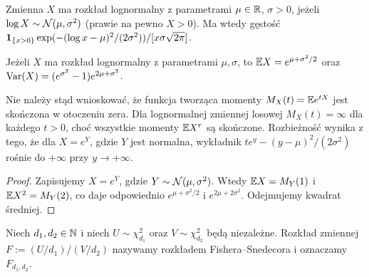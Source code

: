 \begin{definicja}
Zmienna $X$ ma rozkład lognormalny z parametrami
$\mu\in\mathbb{R}$, $\sigma>0$, jeżeli $\log X\sim\mathcal{N}(\mu,\sigma^2)$
(prawie na pewno $X>0$). Ma wtedy gęstość
$\mathbf{1}_{\{x>0\}}\exp(- (\log x-\mu)^2/(2\sigma^2))
/[x\sigma\sqrt{2\pi}]$.
\end{definicja}

\begin{stwierdzenie}
Jeżeli $X$ ma rozkład lognormalny z parametrami $\mu,\sigma$,
to $\mathbb{E} X=e^{\mu+\sigma^2/2}$ oraz
$\operatorname{Var}(X)=(e^{\sigma^2}-1)e^{2\mu+\sigma^2}$.
\end{stwierdzenie}
\begin{uwaga}
Nie należy stąd wnioskować, że funkcja tworząca momenty
$M_X(t)=\mathbb{E} e^{tX}$ jest skończona w otoczeniu zera.
Dla lognormalnej zmiennej losowej $M_X(t)=\infty$
dla każdego $t>0$, choć wszystkie momenty
$\mathbb{E} X^r$ są skończone. Rozbieżność wynika z tego,
że dla $X=e^Y$, gdzie $Y$ jest normalna,
wykładnik $te^y-(y-\mu)^2/(2\sigma^2)$
rośnie do $+\infty$ przy $y\to+\infty$.
\end{uwaga}
\begin{proof}
Zapisujemy $X=e^Y$, gdzie $Y\sim\mathcal{N}(\mu,\sigma^2)$.
Wtedy $\mathbb{E} X=M_Y(1)$ i $\mathbb{E} X^2=M_Y(2)$,
co daje odpowiednio $e^{\mu+\sigma^2/2}$ i
$e^{2\mu+2\sigma^2}$. Odejmujemy kwadrat średniej.
\end{proof}

\begin{definicja}
Niech $d_1,d_2\in\mathbb{N}$ i niech $U\sim\chi^2_{d_1}$ oraz
$V\sim\chi^2_{d_2}$ będą niezależne. Rozkład zmiennej
$F:=(U/d_1)/(V/d_2)$ nazywamy rozkładem Fishera--Snedecora
i oznaczamy $F_{d_1,d_2}$.
\end{definicja}

